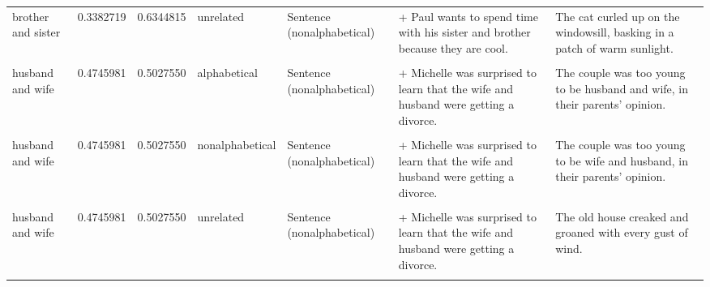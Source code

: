 \documentclass[
  12pt,
]{scrartcl}
\begin{document}
\begin{landscape}
\begin{longtable}{lrrllll}
brother and sister & 0.3382719 & 0.6344815 & unrelated & Sentence (nonalphabetical) & + Paul wants to spend time with his sister and brother because they are cool. & The cat curled up on the windowsill, basking in a patch of warm sunlight.\\
\cellcolor{gray!6}{husband and wife} & \cellcolor{gray!6}{0.4745981} & \cellcolor{gray!6}{0.5027550} & \cellcolor{gray!6}{alphabetical} & \cellcolor{gray!6}{Sentence (alphabetical)} & \cellcolor{gray!6}{+ Michelle was surprised to learn that the husband and wife were getting a divorce.} & \cellcolor{gray!6}{The couple was too young to be husband and wife, in their parents' opinion.}\\
husband and wife & 0.4745981 & 0.5027550 & alphabetical & Sentence (nonalphabetical) & + Michelle was surprised to learn that the wife and husband were getting a divorce. & The couple was too young to be husband and wife, in their parents' opinion.\\
\cellcolor{gray!6}{husband and wife} & \cellcolor{gray!6}{0.4745981} & \cellcolor{gray!6}{0.5027550} & \cellcolor{gray!6}{nonalphabetical} & \cellcolor{gray!6}{Sentence (alphabetical)} & \cellcolor{gray!6}{+ Michelle was surprised to learn that the husband and wife were getting a divorce.} & \cellcolor{gray!6}{The couple was too young to be wife and husband, in their parents' opinion.}\\
\addlinespace
husband and wife & 0.4745981 & 0.5027550 & nonalphabetical & Sentence (nonalphabetical) & + Michelle was surprised to learn that the wife and husband were getting a divorce. & The couple was too young to be wife and husband, in their parents' opinion.\\
\cellcolor{gray!6}{husband and wife} & \cellcolor{gray!6}{0.4745981} & \cellcolor{gray!6}{0.5027550} & \cellcolor{gray!6}{unrelated} & \cellcolor{gray!6}{Sentence (alphabetical)} & \cellcolor{gray!6}{+ Michelle was surprised to learn that the husband and wife were getting a divorce.} & \cellcolor{gray!6}{The old house creaked and groaned with every gust of wind.}\\
husband and wife & 0.4745981 & 0.5027550 & unrelated & Sentence (nonalphabetical) & + Michelle was surprised to learn that the wife and husband were getting a divorce. & The old house creaked and groaned with every gust of wind.\\
\cellcolor{gray!6}{north and south} & \cellcolor{gray!6}{0.4390121} & \cellcolor{gray!6}{0.6108187} & \cellcolor{gray!6}{alphabetical} & \cellcolor{gray!6}{Sentence (alphabetical)} & \cellcolor{gray!6}{+ The family moved north and south a couple of times.} & \cellcolor{gray!6}{The campaign has supporters from both north and south regions.}\\

\end{longtable}
\end{landscape}
\end{document}
